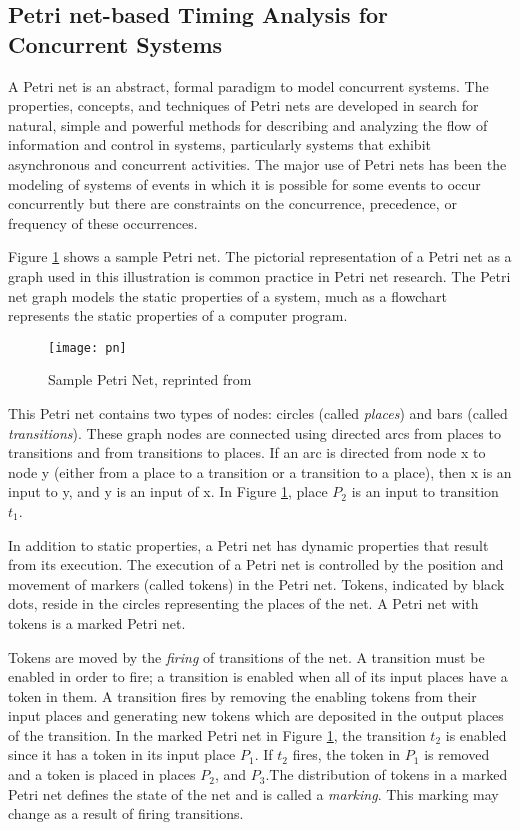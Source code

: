 \subsection{Petri net-based Timing Analysis for Concurrent Systems}
\label{sec:petri_nets}

A Petri net \cite{peterson1977petri} is an abstract, formal paradigm to model concurrent systems. The properties, concepts, and techniques of Petri nets are developed in search for natural, simple and powerful methods for describing and analyzing the flow of information and control in systems, particularly systems that exhibit asynchronous and concurrent activities. The major use of Petri nets has been the modeling of systems of events in which it is possible for some events to occur concurrently but there are constraints on the concurrence, precedence, or frequency of these occurrences. 

Figure \ref{fig:pn} shows a sample Petri net. The pictorial representation of a Petri net as a graph used in this illustration is common practice in Petri net research. The Petri net graph models the static properties of a system, much as a flowchart represents the static properties of a computer program. 

\begin{figure}[h]
	\centering
	\texttt{[image: pn]}
	\caption{Sample Petri Net, reprinted from \cite{peterson1977petri}}
	\label{fig:pn}
\end{figure}

This Petri net contains two types of nodes: circles (called \emph{places}) and bars (called \emph{transitions}). These graph nodes are connected using directed arcs from places to transitions and from transitions to places. If an arc is directed from node x to node y (either from a place to a transition or a transition to a place), then x is an input to y, and y is an input of x. In Figure \ref{fig:pn}, place $P_2$ is an input to transition $t_1$. 

In addition to static properties, a Petri net has dynamic properties that result from its execution. The execution of a Petri net is controlled by the position and movement of markers (called tokens) in the Petri net. Tokens, indicated by black dots, reside in the circles representing the places of the net. A Petri net with tokens is a marked Petri net. 

Tokens are moved by the \emph{firing} of transitions of the net. A transition must be enabled in order to fire; a transition is enabled when all of its input places have a token in them. A transition fires by removing the enabling tokens from their input places and generating new tokens which are deposited in the output places of the transition. In the marked Petri net in Figure \ref{fig:pn}, the transition $t_2$ is enabled since it has a token in its input place $P_1$. If $t_2$ fires, the token in $P_1$ is removed and a token is placed in places $P_2$, and $P_3$.The distribution of tokens in a marked Petri net defines the state of the net and is called a \emph{marking}. This marking may change as a result of firing transitions. 

